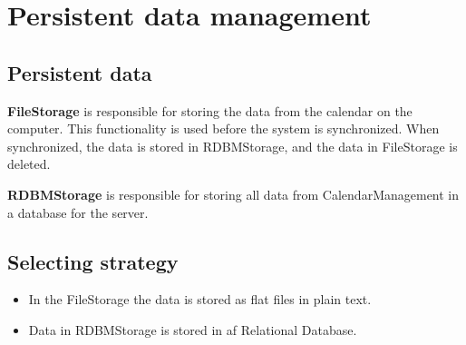 \section{Persistent data management}
\subsection{Persistent data}

\textbf {FileStorage} is responsible for storing the data from the calendar on the computer. This functionality is used before the system is synchronized. When synchronized, the data is stored in RDBMStorage, and the data in FileStorage is deleted. 

\textbf{RDBMStorage} is responsible for storing all data from CalendarManagement in a database for the server. 


\subsection*{Selecting strategy}
\begin{itemize}
	\item In the FileStorage the data is stored as flat files in plain text. 
	\item Data in RDBMStorage is stored in af Relational Database. 
\end{itemize}